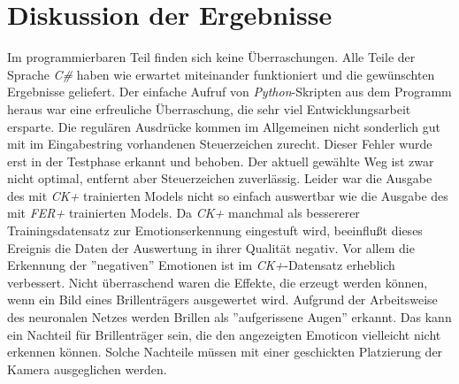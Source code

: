 \documentclass[12pt,a4paper,headinclude,twoside, plainheadsepline, open=right,numbers=noenddot]{scrreprt}
\begin{document}
\section{Diskussion der Ergebnisse}
Im programmierbaren Teil finden sich keine \"{U}berraschungen. Alle Teile der Sprache \textit{C\#} haben wie erwartet miteinander funktioniert und die gew\"{u}nschten Ergebnisse geliefert. Der einfache Aufruf von \textit{Python}-Skripten aus dem Programm heraus war eine erfreuliche \"{U}berraschung, die sehr viel Entwicklungsarbeit ersparte. Die regul\"{a}ren Ausdr\"{u}cke kommen im Allgemeinen nicht sonderlich gut mit im Eingabestring vorhandenen Steuerzeichen zurecht. Dieser Fehler wurde erst in der Testphase erkannt und behoben. Der aktuell gew\"{a}hlte Weg ist zwar nicht optimal, entfernt aber Steuerzeichen zuverl\"{a}ssig. Leider war die Ausgabe des mit \textit{CK+} trainierten Models nicht so einfach auswertbar wie die Ausgabe des mit \textit{FER+} trainierten Models. Da \textit{CK+} manchmal als bessererer Trainingsdatensatz zur Emotionserkennung eingestuft wird, beeinflu{\ss}t dieses Ereignis die Daten der Auswertung in ihrer Qualit\"{a}t negativ. Vor allem die Erkennung der ''negativen'' Emotionen ist im \textit{CK+}-Datensatz erheblich verbessert.  Nicht \"{u}berraschend waren die Effekte, die erzeugt werden k\"{o}nnen, wenn ein Bild eines Brillentr\"{a}gers ausgewertet wird. Aufgrund der Arbeitsweise des neuronalen Netzes werden Brillen als ''aufgerissene Augen'' erkannt. Das kann ein Nachteil f\"{u}r Brillentr\"{a}ger sein, die den angezeigten Emoticon vielleicht nicht erkennen k\"{o}nnen. Solche Nachteile m\"{u}ssen mit einer geschickten Platzierung der Kamera ausgeglichen werden.
\end{document}
